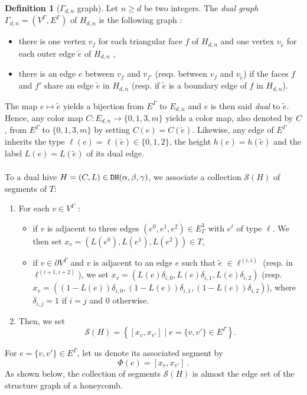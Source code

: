\documentclass[11pt,a4paper]{amsart}
\providecommand{\dualhive}{\texttt{\textsc{DH}}}
\numberwithin{equation}{section}
\theoremstyle{definition}
\newtheorem{definition}[theorem]{Definition}
\begin{document}
\begin{definition}[$\Gamma_{d, n}$ graph]
    Let $n \geqslant d$ be two integers. 
    The \textit{dual graph} $\Gamma_{d, n} = 
    (V^\Gamma, E^\Gamma)$ of $H_{d, n}$ is the following graph :
    \begin{itemize}
    \item there is one vertex $v_f$ for each triangular 
    face $f$ of $H_{d,n}$ and one vertex $v_{\tilde{e}}$ 
    for each outer edge $\tilde{e}$ of $H_{d,n}$ ,
    \item there is an edge $e$ between $v_f$ and $v_{f'}$ 
    (resp. between $v_f$ and $v_{\tilde{e}}$) if the faces $f$ and $f'$ 
    share an edge $\tilde{e}$ in $H_{d,n}$ 
    (resp. if $\tilde{e}$ is a boundary edge of $f$ in $H_{d,n}$).
    \end{itemize}
\end{definition}

\noindent
The map $e\mapsto \tilde{e}$ yields a bijection from $E^{\Gamma}$ 
to $E_{d,n}$ and $e$ is then said \textit{dual} to $\tilde{e}$. 
Hence, any color map $C:E_{d,n}\rightarrow \{0,1,3,m\}$ yields a 
color map, also denoted by $C$, from $E^\Gamma$ to $\{0,1,3,m\}$ 
by setting $C(e)=C(\tilde{e})$. 
Likewise, any edge of $E^{\Gamma}$ inherits the type 
$\ell(e)=\ell(\tilde{e})\in\{0,1,2\}$, the height 
$h(e)=h(\tilde{e})$ and the label 
$L(e)=L(\tilde{e})$ of its dual edge.
\\
\\
To a dual hive $H=(C,L)\in \dualhive(\alpha,\beta,\gamma)$, 
we associate a collection $\mathcal{S}(H)$ of segments 
of $T$:

\begin{enumerate}
\item For each $v\in V^{\Gamma}$ :
\begin{itemize}
\item if $v$ is adjacent to three edges 
$(e^0,e^1,e^2) \in E_\Gamma^3$ with $e^\ell$ of type $\ell$. 
We then set $x_v= \left(L(e^0),L(e^1),L(e^2)\right) \in T$,
\item if $v\in \partial V^{\Gamma}$ and $v$ is adjacent to an 
edge $e$ such that $\tilde{e}$ $\in \ell^{(i,i)}$ 
(resp. in $\ell^{(i+1,i+2)}$), 
we set $x_v=(L(e)\delta_{i, 0}, L(e) \delta_{i, 1}, 
L(e)\delta_{i, 2})$ 
(resp. $x_v=((1-L(e))\delta_{i, 0}, (1-L(e)) \delta_{i, 1}, 
(1-L(e)) \delta_{i, 2})$), 
where $\delta_{i, j} = 1 $ if $i=j$ and $0$ otherwise.
\end{itemize}
\item Then, we set 
$$\mathcal{S}(H) = \left\{[x_v,x_{v'}] \mid e=\{v,v'\} \in E^\Gamma \right\} .$$
\end{enumerate}
For $e=\{v,v'\} \in E^\Gamma$, let us denote its associated segment by 
\begin{equation}
    \label{eq:def_Phi}
    \Phi(e) = [x_v,x_{v'}] \ .
\end{equation}
As shown below, the collection of segments 
$\mathcal{S}(H)$ is almost the edge set of the 
structure graph of a honeycomb.
\end{document}
